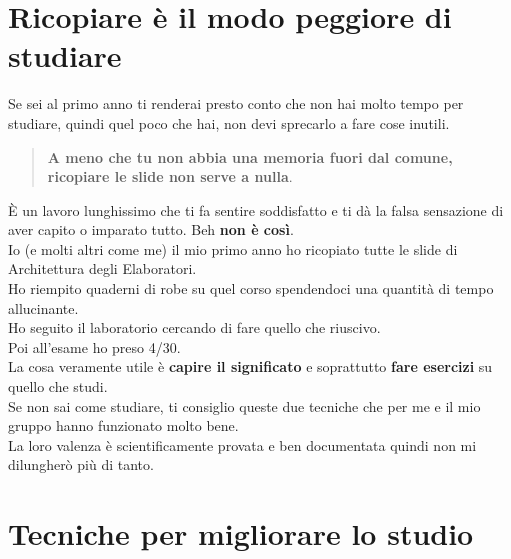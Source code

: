\documentclass[18pt]{extarticle}
\begin{document}
\section{Ricopiare è il modo peggiore di studiare}
Se sei al primo anno ti renderai presto conto che non hai molto tempo per studiare, quindi quel poco che hai, non devi sprecarlo a fare cose inutili.\\
\begin{quote}
\textbf{A meno che tu non abbia una memoria fuori dal comune, ricopiare le slide non serve a nulla}.
\end{quote}%
È un lavoro lunghissimo che ti fa sentire soddisfatto e ti dà la falsa sensazione di aver capito o imparato tutto. 
Beh \textbf{non è così}.\\
Io (e molti altri come me) il mio primo anno ho ricopiato tutte le slide di Architettura degli Elaboratori.\\
Ho riempito quaderni di robe su quel corso spendendoci una quantità di tempo allucinante.\\
Ho seguito il laboratorio cercando di fare quello che riuscivo.\\
Poi all'esame ho preso 4/30.\\
La cosa veramente utile è \textbf{capire il significato} e soprattutto \textbf{fare esercizi} su quello che studi.\\
Se non sai come studiare, ti consiglio queste due tecniche che per me e il mio gruppo hanno funzionato molto bene.\\
La loro valenza è scientificamente provata e ben documentata quindi non mi dilungherò più di tanto.


\section{Tecniche per migliorare lo studio}
\end{document}
